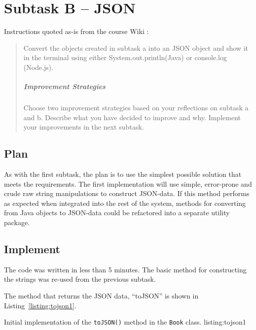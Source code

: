 \section{Subtask B -- JSON}\label{subtask-b-json}
Instructions quoted as-is from the course Wiki \cite{1dv600:lab1:instructions}:

\begin{quote}
  Convert the objects created in subtask a into an JSON object and show it in
  the terminal using either System.out.println(Java) or console.log (Node.js).
  
  \subparagraph{Improvement Strategies}
  
  Choose two improvement strategies based on your reflections on subtask a and
  b. Describe what you have decided to improve and why. Implement your 
  improvements in the next subtask.
\end{quote}

\subsection{Plan}\label{task-1b-plan}
As with the first subtask, the plan is to use the simplest possible solution
that meets the requirements.
The first implementation will use simple, error-prone and crude raw string
manipulations to construct JSON-data.
If this method performs as expected when integrated into the rest of the system,
methods for converting from Java objects to JSON-data could be refactored into
a separate utility package.

\subsection{Implement}\label{task-1b-implement}
The code was written in less than 5 minutes. The basic method for
constructing the strings was re-used from the previous subtask.

The method that returns the JSON data, ``toJSON'' is shown in Listing~\ref{listing:tojson1}.

           {Initial implementation of the \texttt{toJSON()} method in the
            \texttt{Book} class.}
           {listing:tojson1}



